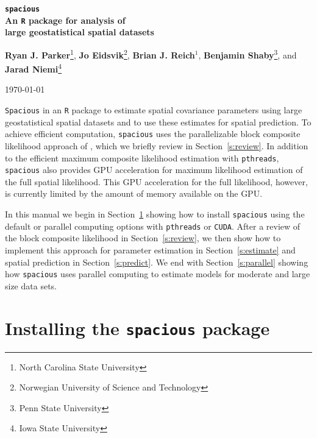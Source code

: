 \documentclass[11pt]{article}
\begin{document}
\linenumbers

\pagestyle{empty}
\begin{center}
{\Large
	{\bf
		{\tt spacious} \\
		\vspace{3pt}
		An {\tt R} package for analysis of \\
		\vspace{4pt}
		large geostatistical spatial datasets
	}
}

\vspace{24pt}
\textbf{Ryan J. Parker}\footnote{North Carolina State University},
\textbf{Jo Eidsvik}\footnote{Norwegian University of Science and Technology},
\textbf{Brian J. Reich$^1$},
\textbf{Benjamin Shaby}\footnote{Penn State University}, and
\textbf{Jarad Niemi}\footnote{Iowa State University}
\vspace{24pt}

\today
\end{center}

{\tt Spacious} in an {\tt R} package to estimate spatial covariance parameters using large geostatistical spatial datasets and to use these estimates for spatial prediction.
To achieve efficient computation, {\tt spacious} uses the parallelizable block composite likelihood approach of \cite{Eidsvik:2013}, which we briefly review in Section~\ref{s:review}.
In addition to the efficient maximum composite likelihood estimation with {\tt pthreads}, {\tt spacious} also provides GPU acceleration for maximum likelihood estimation of the full spatial likelihood.
This GPU acceleration for the full likelihood, however, is currently limited by the amount of memory available on the GPU.

In this manual we begin in Section~\ref{s:install} showing how to install {\tt spacious} using the default or parallel computing options with {\tt pthreads} or {\tt CUDA}.
After a review of the block composite likelihood in Section~\ref{s:review}, we then show how to implement this approach for parameter estimation in Section~\ref{s:estimate} and spatial prediction in Section~\ref{s:predict}.
We end with Section~\ref{s:parallel} showing how {\tt spacious} uses parallel computing to estimate models for moderate and large size data sets.

\section{Installing the {\tt spacious} package}\label{s:install}
\end{document}
